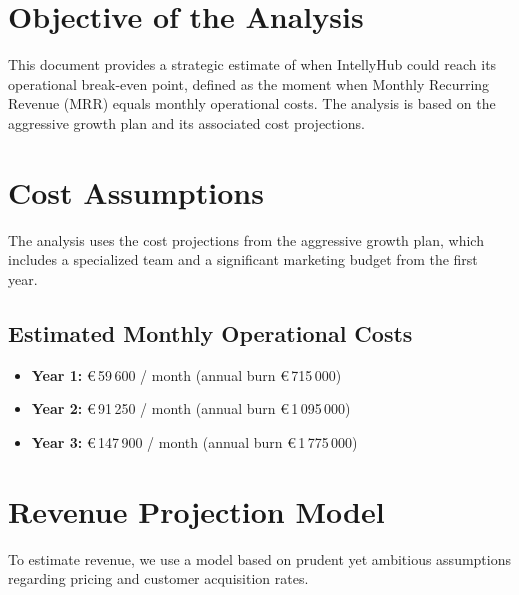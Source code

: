 \documentclass[11pt, a4paper, oneside]{article}
\begin{document}
\section{Objective of the Analysis}
This document provides a strategic estimate of when IntellyHub could reach its operational break-even point, defined as the moment when Monthly Recurring Revenue (MRR) equals monthly operational costs. The analysis is based on the aggressive growth plan and its associated cost projections.

\section{Cost Assumptions}
The analysis uses the cost projections from the aggressive growth plan, which includes a specialized team and a significant marketing budget from the first year.

\subsection*{Estimated Monthly Operational Costs}
\begin{itemize}
  \item \textbf{Year 1:} \euro{}\,59\,600 / month (annual burn \euro{}\,715\,000)
  \item \textbf{Year 2:} \euro{}\,91\,250 / month (annual burn \euro{}\,1\,095\,000)
  \item \textbf{Year 3:} \euro{}\,147\,900 / month (annual burn \euro{}\,1\,775\,000)
\end{itemize}

\section{Revenue Projection Model}
To estimate revenue, we use a model based on prudent yet ambitious assumptions regarding pricing and customer acquisition rates.
\end{document}
